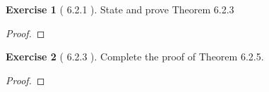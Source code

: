 \documentclass[11pt]{article}		%
\theoremstyle{definition}
\newtheorem*{exercise*}{Exercise}
\begin{document}
\vspace{1in}
\begin{exercise*}[ 6.2.1   ]
	State and prove Theorem 6.2.3
	
\end{exercise*}

\begin{proof} 
	
\end{proof}


\vspace{1in}
\begin{exercise*}[ 6.2.3  ]
	Complete the proof of Theorem 6.2.5.
	
\end{exercise*}

\begin{proof} 
	
\end{proof}


\vspace{1in}
\end{document}
